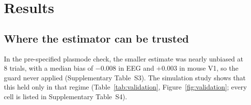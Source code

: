 \documentclass[11pt]{article}
\newcommand{\EegBias}{$-0.008$}
\newcommand{\MouseBias}{$+0.003$}
\begin{document}
\section{Results}\label{sec:results}

\subsection{Where the estimator can be trusted}\label{sec:res-val}

In the pre-specified plasmode check, the smaller estimate was nearly unbiased at 8 trials, with a median bias of \EegBias{} in EEG and \MouseBias{} in mouse V1, so the guard never applied (Supplementary Table~S3).
The simulation study shows that this held only in that regime (Table~\ref{tab:validation}, Figure~\ref{fig:validation}; every cell is listed in Supplementary Table~S4).
\end{document}
